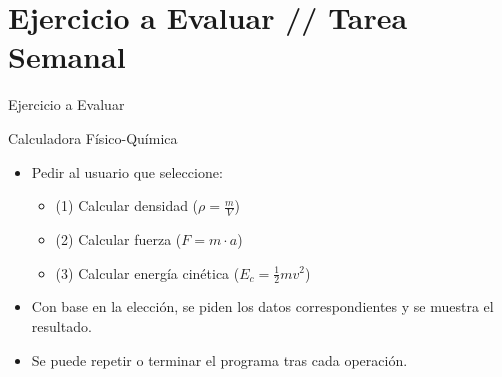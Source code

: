 \documentclass[10pt]{beamer}
\begin{document}
\section{Ejercicio a Evaluar // Tarea Semanal}
\begin{frame}{Ejercicio a Evaluar}
  \begin{block}{Calculadora Físico-Química}
    \begin{itemize}
      \item Pedir al usuario que seleccione:
        \begin{itemize}
          \item (1) Calcular densidad (\(\rho = \frac{m}{V}\))
          \item (2) Calcular fuerza (\(F = m \cdot a\))
          \item (3) Calcular energía cinética (\(E_c = \frac{1}{2}mv^2\))
        \end{itemize}
      \item Con base en la elección, se piden los datos correspondientes y se muestra el resultado.
      \item Se puede repetir o terminar el programa tras cada operación.
    \end{itemize}
  \end{block}
\end{frame}

\end{document}
